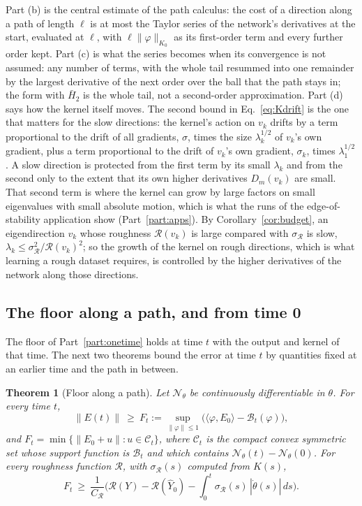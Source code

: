 \documentclass[11pt]{article}
\newtheorem{theorem}{Theorem}
\theoremstyle{definition}
\theoremstyle{remark}
\newcommand{\Net}{\mathcal{N}_\theta}    %
\newcommand{\Rgh}{\mathcal{R}}           %
\newcommand{\sR}{\sigma_{\Rgh}}
\newcommand{\CR}{C_{\Rgh}}
\newcommand{\ip}[2]{\langle #1,#2\rangle}
\newcommand{\cost}{\mathcal{B}}          %
\begin{document}
Part (b) is the central estimate of the path calculus: the cost of a direction along a path of length $\ell$ is at most the Taylor series of the network's derivatives at the start, evaluated at $\ell$, with $\ell\|\varphi\|_{K_0}$ as its first-order term and every further order kept.
Part (c) is what the series becomes when its convergence is not assumed: any number of terms, with the whole tail resummed into one remainder by the largest derivative of the next order over the ball that the path stays in; the form with $\bar H_2$ is the whole tail, not a second-order approximation.
Part (d) says how the kernel itself moves.
The second bound in Eq.~\eqref{eq:Kdrift} is the one that matters for the slow directions: the kernel's action on $v_k$ drifts by a term proportional to the drift of all gradients, $\sigma$, times the size $\lambda_k^{1/2}$ of $v_k$'s own gradient, plus a term proportional to the drift of $v_k$'s own gradient, $\sigma_k$, times $\lambda_1^{1/2}$.
A slow direction is protected from the first term by its small $\lambda_k$ and from the second only to the extent that its own higher derivatives $D_m(v_k)$ are small.
That second term is where the kernel can grow by large factors on small eigenvalues with small absolute motion, which is what the runs of the edge-of-stability application show (Part~\ref{part:apps}).
By Corollary~\ref{cor:budget}, an eigendirection $v_k$ whose roughness $\Rgh(v_k)$ is large compared with $\sR$ is slow, $\lambda_k\le\sR^2/\Rgh(v_k)^2$; so the growth of the kernel on rough directions, which is what learning a rough dataset requires, is controlled by the higher derivatives of the network along those directions.

\subsection{The floor along a path, and from time 0}

The floor of Part~\ref{part:onetime} holds at time $t$ with the output and kernel of that time.
The next two theorems bound the error at time $t$ by quantities fixed at an earlier time and the path in between.

\begin{theorem}[Floor along a path]\label{thm:path}
Let $\Net$ be continuously differentiable in $\theta$.
For every time $t$,
\begin{equation}\label{eq:pathfloor}
\|E(t)\|\ \ge\ F_t := \sup_{\|\varphi\|\le1}\Big(\ip{\varphi}{E_0} - \cost_t(\varphi)\Big),
\end{equation}
and $F_t = \min\{\|E_0 + u\| : u\in\mathcal{C}_t\}$, where $\mathcal{C}_t$ is the compact convex symmetric set whose support function is $\cost_t$ and which contains $\Net(t) - \Net(0)$.
For every roughness function $\Rgh$, with $\sR(s)$ computed from $K(s)$,
\begin{equation}\label{eq:pathrough}
F_t\ \ge\ \frac{1}{\CR}\Big(\Rgh(Y) - \Rgh(\hat Y_0) - \int_0^t\sR(s)\,|\dot\theta(s)|\,ds\Big).
\end{equation}
\end{theorem}
\end{document}
